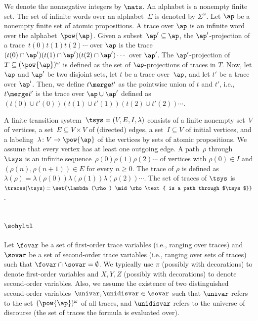 We denote the nonnegative integers by $\nats$. 
An alphabet is a nonempty finite set. 
The set of infinite words over an alphabet~$\Sigma$ is denoted by $\Sigma^\omega$.
Let $\ap$ be a nonempty finite set of atomic propositions. 
A trace over $\ap$ is an infinite word over the alphabet~$\pow{\ap}$.
Given a subset~$\ap' \subseteq \ap$, the $\ap'$-projection of a trace~$t(0)t(1)t(2) \cdots$ over $\ap$ is the trace~$(t(0) \cap \ap')(t(1) \cap \ap')(t(2) \cap \ap') \cdots$ over $\ap'$.
The $\ap'$-projection of $T \subseteq (\pow{\ap})^\omega$ is defined as the set of $\ap$-projections of traces in $T$.
Now, let $\ap$ and $\ap'$ be two disjoint sets, let $t$ be a trace over~$\ap$, and let $t'$ be a trace over $\ap'$. 
Then, we define $t \merge t'$ as the pointwise union of $t$ and $t'$, i.e., $t \merge t'$ is the trace over $\ap \cup \ap'$ defined as $(t(0) \cup t'(0))(t(1) \cup t'(1))(t(2) \cup t'(2))\cdots$.

A finite transition system~$\tsys = (V,E,I, \lambda)$ consists of a finite nonempty set~$V$ of vertices, a set~$E \subseteq V \times V$ of (directed) edges, a set~$I \subseteq V$ of initial vertices, and a labeling~$\lambda\colon V \rightarrow \pow{\ap}$ of the vertices by sets of atomic propositions.
We assume that every vertex has at least one outgoing edge.
A path~$\rho$ through~$\tsys$ is an infinite sequence~$\rho(0)\rho(1)\rho(2)\cdots$ of vertices with $\rho(0) \in I$ and $(\rho(n),\rho(n+1))\in E$ for every $n \ge 0$.
The trace of $\rho$ is defined as $ \lambda(\rho ) = \lambda(\rho(0))\lambda(\rho(1))\lambda(\rho(2))\cdots$.
The set of traces of $\tsys$ is $\traces(\tsys) = \set{\lambda(\rho) \mid \rho \text{ is a path through $\tsys$}}$.

\subsection{\texorpdfstring{\boldmath$\sohyltl$}{Second-order HyperLTL}}
\label{subsec_hyperltl}
Let $\fovar$ be a set of first-order trace variables (i.e., ranging over traces) and $\sovar$ be a set of second-order trace variables (i.e., ranging over sets of traces) such that $\fovar \cap \sovar = \emptyset$.
We typically use $\pi$ (possibly with decorations) to denote first-order variables and $X, Y, Z$ (possibly with decorations) to denote second-order variables.
Also, we assume the existence of two distinguished second-order variables~$\univar, \unidisvar  \in \sovar$ such that $\univar$ refers to the set~$(\pow{\ap})^\omega$ of all traces, and $\unidisvar$ refers to the universe of discourse (the set of traces the formula is evaluated over).

